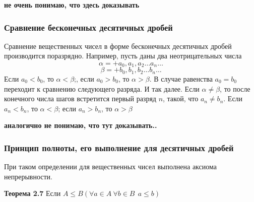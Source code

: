 \documentclass[12pt, a4paper]{article}
\begin{document}
    \textbf{не очень понимаю, что здесь доказывать}
    \subsubsection{Сравнение бесконечных десятичных дробей}
    Сравнение вещественных чисел в форме бесконечных десятичных дробей производится поразрядно. Например, пусть даны два неотрицательных числа 
    \begin{equation*}
        \alpha = + a_0, a_1, a_2 \dots a_n \dots
    \end{equation*}
    \begin{equation*}
        \beta = +b_0, b_1, b_2 \dots b_n \dots
    \end{equation*}
    Если $a_0 < b_0$, то $\alpha < \beta$;, если $a_0 > b_0$, то $\alpha > \beta$. В случае равенства $a_0 = b_0$ переходит к сравнению следующего разряда. И так далее. Если $\alpha \ne \beta$, то после конечного числа шагов встретится первый разряд $n$, такой, что $a_n \ne b_n$. Если $a_n < b_n$, то $\alpha < \beta$; если $a_n > b_n$, то $\alpha > \beta$

    \textbf{аналогично не понимаю, что тут доказывать..}
    \subsubsection{Принцип полноты, его выполнение для десятичных дробей}
    При таком определении для вещественных чисел выполнена аксиома непрерывности.
    
    \textbf{Теорема 2.7} Если $A \leq B (\forall a \in A \ \forall b \in B \ \ a \leq b)$
    
\end{document}
